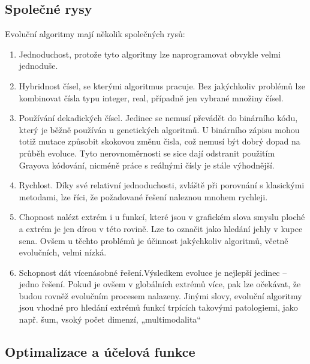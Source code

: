 \documentclass[bc,male,java,dept460]{diploma}		%
\begin{document}
\subsection{Společné rysy}
Evoluční algoritmy mají několik společných rysů:
\begin{enumerate}
\item Jednoduchost, protože tyto algoritmy lze naprogramovat obvykle velmi jednoduše.
\item Hybridnost čísel, se kterými algoritmus pracuje. Bez jakýchkoliv problémů lze kombinovat čísla typu integer, real, případně jen vybrané množiny čísel.
\item Používání dekadických čísel. Jedinec se nemusí převádět do binárního kódu, který je běžně používán u genetických algoritmů. U binárního zápisu mohou totiž mutace způsobit skokovou změnu čisla, což nemusí být dobrý dopad na průběh evoluce. Tyto nerovnoměrnosti se sice dají odstranit použitím Grayova kódování, nicméně práce s reálnými čísly je stále výhodnější.
\item Rychlost. Díky své relativní jednoduchosti, zvláště při porovnání s klasickými metodami, lze říci, že požadované řešení naleznou mnohem rychleji.
\item Chopnost nalézt extrém i u funkcí, které jsou v grafickém slova smyslu ploché a extrém je jen dírou v této rovině. Lze to označit jako hledání jehly v kupce sena. Ovšem u těchto problémů je účinnost jakýchkoliv algoritmů, včetně evolučních, velmi nízká.
\item Schopnost dát vícenásobné řešení.Výsledkem evoluce je nejlepší jedinec – jedno řešení. Pokud je ovšem v globálních extrémů více, pak lze očekávat, že budou rovněž evolučním procesem nalazeny.
Jinými slovy, evoluční algoritmy jsou vhodné pro hledání extrémů funkcí trpících takovými patologiemi, jako např. šum, vsoký počet dimenzí, „multimodalita“
\end{enumerate}

\subsection{Optimalizace a účelová funkce}
\end{document}

